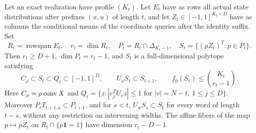 \begin{theorem}\label{thm:section51}
Let an exact realization have profile $(K_t)$. Let $E_t$ have as rows
all actual state distributions after prefixes $(x,u)$ of length $t$,
and let $Z_t\in[-1,1]^{K_t\times D}$ have as columns the conditional
means of the coordinate queries after the identity suffix. Set
\[
 R_t=\operatorname{rowspan}E_t,\quad r_t=\dim R_t,\quad
 P_t=R_t\cap\Delta_{K_t-1},\quad S_t=\{(pZ_t)^T:p\in P_t\}.
\]
Then $r_t\ge D+1$, $\dim P_t=r_t-1$, and $S_t$ is a
full-dimensional polytope satisfying
\begin{equation}\label{eq:section51}
 C_\rho\subset S_t\subset Q_t\subset[-1,1]^D,\qquad
 U_aS_t\subset S_{t+1},\qquad
 f_0(S_t)\le {K_t\choose r_t-1}.
\end{equation}
Here $C_\rho=\rho\operatorname{conv} X$ and
$Q_t=\{z:|e_j^TU_vz|\le1\text{ for }|v|=N-t,\ 1\le j\le D\}$.
Moreover $P_tT_{t+1,a}\subset P_{t+1}$, and for $s<t$,
$U_wS_s\subset S_t$ for every word of length $t-s$, without any
restriction on intervening widths. The affine fibers of the map
$p\mapsto pZ_t$ on $R_t\cap\{p\mathbf1=1\}$ have dimension
$r_t-D-1$.
\end{theorem}
